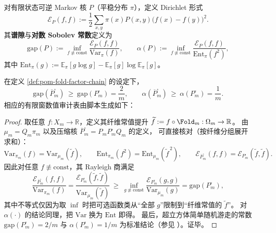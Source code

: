 \begin{definition}\label{def:pom-gap-lsi}
对有限状态可逆 Markov 核 \(P\)（平稳分布 \(\pi\)），定义 Dirichlet 形式
\[
\mathcal E_P(f,f):=\frac12\sum_{x,y}\pi(x)P(x,y)\bigl(f(x)-f(y)\bigr)^2.
\]
其\textbf{谱隙}与\textbf{对数 Sobolev 常数}定义为
\[
\mathrm{gap}(P):=\inf_{f\not\equiv \mathrm{const}}\frac{\mathcal E_P(f,f)}{\mathrm{Var}_{\pi}(f)},
\qquad
\alpha(P):=\inf_{f\not\equiv \mathrm{const}}\frac{\mathcal E_P(f,f)}{\mathrm{Ent}_{\pi}(f^2)},
\]
其中
\(
\mathrm{Ent}_{\pi}(g):=\mathbb E_{\pi}[g\log g]-\mathbb E_{\pi}[g]\log\mathbb E_{\pi}[g]
\)。
\end{definition}

\begin{theorem}\label{thm:pom-fold-factor-chain-gap-lsi}
在定义 \ref{def:pom-fold-factor-chain} 的设定下，
\[
\mathrm{gap}(\overline P^{\square}_m)\ \ge\ \mathrm{gap}(P^{\square}_m)=\frac{2}{m},
\qquad
\alpha(\overline P^{\square}_m)\ \ge\ \alpha(P^{\square}_m)=\frac{1}{m}.
\]
相应的有限窗数值审计表由脚本生成如下：

\end{theorem}
\begin{proof}
取任意 \(f:X_m\to\mathbb R\)，定义其纤维常值提升 \(\widetilde f:=f\circ \Fold_m:\Omega_m\to\mathbb R\)。
由 \(\mu_m=Q_m\pi_m\) 以及压缩核 \(\overline P^{\square}_m=P_mP^{\square}_mQ_m\) 的定义，
可直接核对（按纤维分组展开求和）：
\[
\mathrm{Var}_{\pi_m}(f)=\mathrm{Var}_{\mu_m}(\widetilde f),\qquad
\mathrm{Ent}_{\pi_m}(f^2)=\mathrm{Ent}_{\mu_m}(\widetilde f^{\,2}),
\qquad
\mathcal E_{\overline P^{\square}_m}(f,f)=\mathcal E_{P^{\square}_m}(\widetilde f,\widetilde f).
\]
因此对任意 \(f\not\equiv \mathrm{const}\)，其 Rayleigh 商满足
\[
\frac{\mathcal E_{\overline P^{\square}_m}(f,f)}{\mathrm{Var}_{\pi_m}(f)}
=
\frac{\mathcal E_{P^{\square}_m}(\widetilde f,\widetilde f)}{\mathrm{Var}_{\mu_m}(\widetilde f)}
\ \ge\
\inf_{g\not\equiv \mathrm{const}}\frac{\mathcal E_{P^{\square}_m}(g,g)}{\mathrm{Var}_{\mu_m}(g)}
=\mathrm{gap}(P^{\square}_m),
\]
其中不等式仅因为取 \(\inf\) 时把可选函数类从“全部 \(g\)”限制到“纤维常值的 \(\widetilde f\)”。
对 \(\alpha(\cdot)\) 的结论同理，把 \(\mathrm{Var}\) 换为 \(\mathrm{Ent}\) 即得。
最后，超立方体简单随机游走的常数 \(\mathrm{gap}(P^{\square}_m)=2/m\) 与 \(\alpha(P^{\square}_m)=1/m\) 为标准结论（参见 \cite{LevinPeresWilmer2009MarkovMixing}）。证毕。
\end{proof}


